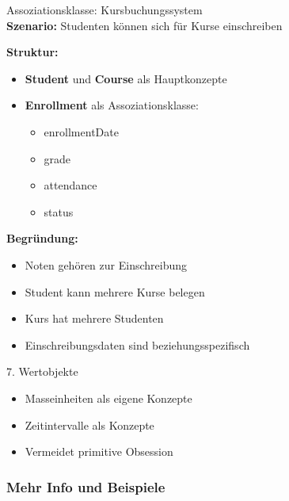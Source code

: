 \begin{example2}{Assoziationsklasse: Kursbuchungssystem}\\
\textbf{Szenario:} Studenten können sich für Kurse einschreiben

\textbf{Struktur:}
\begin{itemize}
    \item \textbf{Student} und \textbf{Course} als Hauptkonzepte
    \item \textbf{Enrollment} als Assoziationsklasse:
    \begin{itemize}
        \item enrollmentDate
        \item grade
        \item attendance
        \item status
    \end{itemize}
\end{itemize}

\textbf{Begründung:}
\begin{itemize}
    \item Noten gehören zur Einschreibung
    \item Student kann mehrere Kurse belegen
    \item Kurs hat mehrere Studenten
    \item Einschreibungsdaten sind beziehungsspezifisch
\end{itemize}
\end{example2}


\begin{concept}{7. Wertobjekte}
\begin{itemize}
    \item Masseinheiten als eigene Konzepte
    \item Zeitintervalle als Konzepte
    \item Vermeidet primitive Obsession
\end{itemize}
\end{concept}

\subsubsection{Mehr Info und Beispiele}


